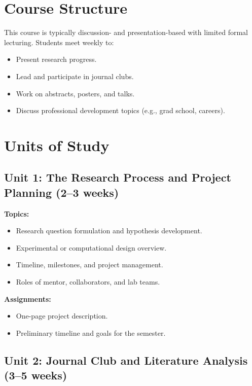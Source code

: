 \documentclass[12pt,oneside]{book}
\begin{document}
\section{Course Structure}

This course is typically discussion- and presentation-based with limited formal lecturing. Students meet weekly to:

\begin{itemize}
    \item Present research progress.
    \item Lead and participate in journal clubs.
    \item Work on abstracts, posters, and talks.
    \item Discuss professional development topics (e.g., grad school, careers).
\end{itemize}

\section{Units of Study}

\subsection{Unit 1: The Research Process and Project Planning (2--3 weeks)}

\textbf{Topics:}
\begin{itemize}
    \item Research question formulation and hypothesis development.
    \item Experimental or computational design overview.
    \item Timeline, milestones, and project management.
    \item Roles of mentor, collaborators, and lab teams.
\end{itemize}

\textbf{Assignments:}
\begin{itemize}
    \item One-page project description.
    \item Preliminary timeline and goals for the semester.
\end{itemize}

\subsection{Unit 2: Journal Club and Literature Analysis (3--5 weeks)}
\end{document}
